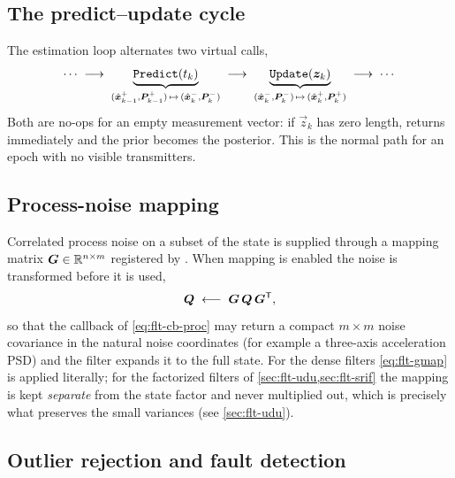\subsection{The predict--update cycle}

The estimation loop alternates two virtual calls,
\begin{equation}
  \label{eq:flt-cycle}
  \cdots \;\longrightarrow\;
  \underbrace{\texttt{Predict}(t_k)}_{(\hat{\bm{x}}^{+}_{k-1},\bm{P}^{+}_{k-1})
    \,\mapsto\,(\hat{\bm{x}}^{-}_{k},\bm{P}^{-}_{k})}
  \;\longrightarrow\;
  \underbrace{\texttt{Update}(\bm{z}_k)}_{(\hat{\bm{x}}^{-}_{k},\bm{P}^{-}_{k})
    \,\mapsto\,(\hat{\bm{x}}^{+}_{k},\bm{P}^{+}_{k})}
  \;\longrightarrow\; \cdots
\end{equation}
Both are no-ops for an empty measurement vector: if $\vec{z}_k$ has zero
length,  returns immediately and the prior becomes the posterior.
This is the normal path for an epoch with no visible transmitters.

\subsection{Process-noise mapping}

Correlated process noise on a subset of the state is supplied through a
mapping matrix $\bm{G} \in \mathbb{R}^{n\times m}$ registered by
. When mapping is enabled the noise is
transformed before it is used,
\begin{equation}
  \label{eq:flt-gmap}
  \bm{Q} \;\longleftarrow\; \bm{G}\,\bm{Q}\,\bm{G}^{\mathsf{T}} ,
\end{equation}
so that the callback of \cref{eq:flt-cb-proc} may return a compact
$m\times m$ noise covariance in the natural noise coordinates (for example a
three-axis acceleration PSD) and the filter expands it to the full state. For
the dense filters \cref{eq:flt-gmap} is applied literally; for the factorized
filters of \cref{sec:flt-udu,sec:flt-srif} the mapping is kept
\emph{separate} from the state factor and never multiplied out, which is
precisely what preserves the small variances (see \cref{sec:flt-udu}).

\subsection{Outlier rejection and fault detection}
\label{sec:flt-outliers}

